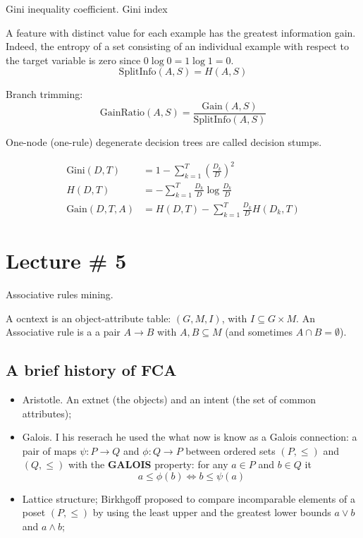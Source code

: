 \documentclass[a4paper]{article}
\newcommand{\brac}[1]{{\left ( #1 \right )}}
\newcommand{\eng}[1]{\foreignlanguage{english}{#1}}
\begin{document}
Gini inequality coefficient.
Gini index

A feature with distinct value for each example has the greatest information gain. Indeed, the entropy of a set consisting of an individual example with respect to the target variable is zero since $0\log 0 = 1 \log 1 = 0$.
\[\text{SplitInfo}(A,S) = H(A,S)\]

Branch trimming:
\[\text{GainRatio}(A,S) = \frac{\text{Gain}(A,S)}{\text{SplitInfo}(A,S)}\]



One-node (one-rule) degenerate decision trees are called \eng{decision stumps}.

\begin{align*}
	\text{Gini}(D,T) &= 1 - \sum_{k=1}^T \brac{\frac{D_k}{D}}^2 \\
	H(D,T) &= - \sum_{k=1}^T \frac{D_k}{D} \log \frac{D_k}{D} \\
	\text{Gain}(D,T,A) &= H(D,T) - \sum_{k=1}^T \frac{D_k}{D} H(D_k,T)
\end{align*}




\section{Lecture \# 5} %
\label{sec:lecture_5}

Associative rules mining.

A ocntext is an object-attribute table: $\brac{G,M,I}$, with $I\subseteq G\times M$.
An Associative rule is a a pair $A\to B$ with $A,B\subseteq M$ (and sometimes $A\cap B = \emptyset$).

\subsection{A brief history of FCA} %
\label{sub:a_brief_history_of_fca}

\begin{itemize}
	\item Aristotle. An extnet (the objects) and an intent (the set of common attributes);
	\item Galois. I his reserach he used the what now is know as a Galois connection: a pair of maps $\psi:P\to Q$ and $\phi:Q\to P$ between ordered sets $(P,\leq)$ and $(Q,\leq)$ with the \textbf{GALOIS} property: for any $a\in P$ and $b\in Q$ it
	\[a\leq \phi(b) \Leftrightarrow b\leq \psi(a)\]
	\item Lattice structure; Birkhgoff proposed to compare incomparable elements of a poset $(P,\leq)$ by using the least upper and the greatest lower bounds $a\vee b$ and $a\wedge b$;
\end{itemize}
\end{document}

